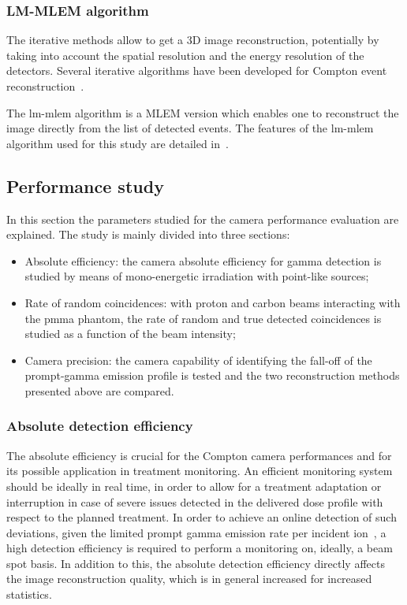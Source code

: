 \subsubsection{LM-MLEM algorithm}\label{chap4::subsubsec::lmmlemalgo}	
The iterative methods allow to get a 3D image reconstruction, potentially by taking into account the spatial resolution and the energy resolution of the detectors. Several iterative algorithms have been developed for Compton event reconstruction~\parencite{Schone2010, Zoglauer2011, Gillam2011, Mackin2012, Huang2018, Taya2017, Schone2017}.

The \gls{lm-mlem} algorithm is a MLEM version which enables one to reconstruct the image directly from the list of detected events.
The features of the \gls{lm-mlem} algorithm used for this study are detailed in~\cite{Hilaire2014}.

\subsection{Performance study}\label{chap4::subsec::MatMeth:performance}
In this section the parameters studied for the camera performance evaluation are explained. The study is mainly divided into three sections:
\begin{itemize}

\item Absolute efficiency: the camera absolute efficiency for gamma detection is studied by means of mono-energetic irradiation with point-like sources;
\item Rate of random coincidences: with proton and carbon beams interacting with the \gls{pmma} phantom, the rate of random and true detected coincidences is studied as a function of the beam intensity;
\item Camera precision: the camera capability of identifying the fall-off of the prompt-gamma emission profile is tested and the two reconstruction methods presented above are compared. 

\end{itemize}


\subsubsection{Absolute detection efficiency}\label{chap4::subsubsec::absEff}
The absolute efficiency is crucial for the Compton camera performances and for its possible application in treatment monitoring. An efficient monitoring system should be ideally in real time, in order to allow for a treatment adaptation or interruption in case of severe issues detected in the delivered dose profile with respect to the planned treatment. In order to achieve an online detection of such deviations, given the limited prompt gamma emission rate per incident ion~\parencite{Ortega2015}, a high detection efficiency is required to perform a monitoring on, ideally, a beam spot basis. In addition to this, the absolute detection efficiency directly affects the image reconstruction quality, which is in general increased for increased statistics.

